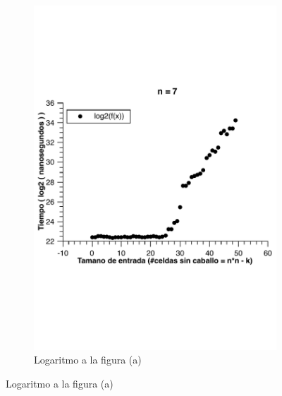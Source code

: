 \begin{figure}[H]
\begin{subfigure}[b]{0.5\textwidth}
                \includegraphics[width=\textwidth]{imagenes/grafico3-n-7-log.pdf}
                \caption{Logaritmo a la figura (a)}
        \end{subfigure}
        

\end{figure}
